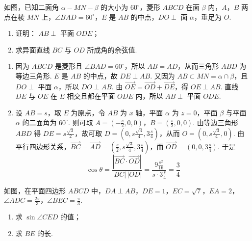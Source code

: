 \begin{problem}
如图，已知二面角 \(\alpha - MN - \beta\) 的大小为 \(60^{\circ}\)，菱形 \(ABCD\) 在面 \(\beta\) 内，\(A\)，\(B\) 两点在棱 \(MN\) 上，\(\angle BAD = 60^{\circ}\)，\(E\) 是 \(AB\) 的中点，\(DO \perp\) 面 \(\alpha\)，垂足为 \(O\).

\begin{enumerate}
\item 证明： \(AB \perp\) 平面 \(ODE\)；
\item 求异面直线 \(BC\) 与 \(OD\) 所成角的余弦值.
\end{enumerate}

\end{problem}

\begin{solution}
\begin{enumerate}
\item 因为 \(ABCD\) 是菱形且 \(\angle BAD=60^\circ\)，所以 \(AB=AD\)，从而三角形 \(ABD\) 为等边三角形. \(E\) 是 \(AB\) 的中点，故 \(DE\perp AB\). 又因为 \(AB\subset MN=\alpha\cap\beta\)，且 \(DO\perp\) 平面 \(\alpha\)，所以 \(DO\perp AB\). 由 \(\overrightarrow{OE}=\overrightarrow{OD}+\overrightarrow{DE}\)，得 \(OE\perp AB\). 直线 \(DE\) 与 \(OE\) 在 \(E\) 相交且都在平面 \(ODE\) 内，所以 \(AB\perp\) 平面 \(ODE\).
\item 设 \(AB=s\)，取 \(E\) 为原点，令 \(AB\) 为 \(x\) 轴，平面 \(\alpha\) 为 \(z=0\)，平面 \(\beta\) 与平面 \(\alpha\) 的二面角为 \(60^\circ\). 则可取 \(A=(-\frac{s}{2},0,0)\)，\(B=(\frac{s}{2},0,0)\). 由等边三角形 \(ABD\) 得 \(DE=s\frac{\sqrt3}{2}\)，故可取 \(D=(0,s\frac{\sqrt3}{4},3\frac{s}{4})\)，从而 \(O=(0,s\frac{\sqrt3}{4},0)\). 由平行四边形关系，\(\overrightarrow{BC}=\overrightarrow{AD}=(\frac{s}{2},s\frac{\sqrt3}{4},3\frac{s}{4})\)，而 \(\overrightarrow{OD}=(0,0,3\frac{s}{4})\). 于是
\[\cos\theta=\frac{|\overrightarrow{BC}\cdot\overrightarrow{OD}|}{|BC|\,|OD|}=\frac{9\frac{s^2}{16}}{s\cdot3\frac{s}{4}}=\frac34\]
\end{enumerate}
\end{solution}

\begin{problem}
如图，在平面四边形 \(ABCD\) 中，\(DA \perp AB\)，\(DE = 1\)，\(EC = \sqrt{7}\)，\(EA = 2\)，\(\angle ADC = \frac{2\pi}{3}\)，\(\angle BEC = \frac{\pi}{3}\).

\begin{enumerate}
\item 求 \( \sin \angle CED \) 的值；
\item 求 \(BE\) 的长.
\end{enumerate}

\end{problem}

